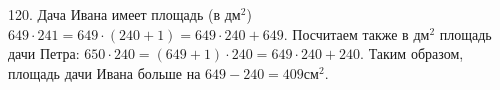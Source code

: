120. Дача Ивана имеет площадь (в $\text{дм}^2$) $649\cdot241=649\cdot(240+1)=649\cdot240+649.$ Посчитаем также в $\text{дм}^2$ площадь дачи Петра:
$650\cdot240=(649+1)\cdot240=649\cdot240+240.$ Таким образом, площадь дачи Ивана больше на $649-240=409\text{см}^2.$\\
